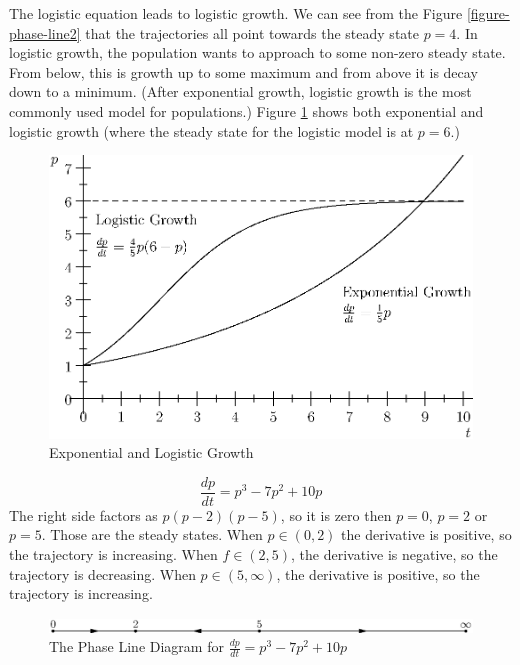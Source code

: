 \documentclass[fleqn]{report}
\begin{document}
The logistic equation leads to logistic growth. We can see
from the Figure \ref{figure-phase-line2} that the trajectories
all point towards the steady state $p=4$. In logistic growth,
the population wants to approach to some non-zero steady
state. From below, this is growth up to some maximum and from
above it is decay down to a minimum. (After exponential
growth, logistic growth is the most commonly used model for
populations.) Figure \ref{figure-exponential-growth}
shows both exponential and logistic growth (where the steady
state for the logistic model is at $p=6$.)

\begin{figure}[t]
\centering
\includegraphics[width=12cm]{figure44.eps}
\caption{Exponential and Logistic Growth}
\label{figure-exponential-growth}
\end{figure}

\begin{example}
\begin{equation*}
\frac{dp}{dt} = p^3 -7p^2 + 10p
\end{equation*}
The right side factors as $p(p-2)(p-5)$, so it is zero then
$p=0$, $p=2$ or $p=5$. Those are the
steady states. When $p \in (0,2)$ the derivative is positive,
so the trajectory is increasing. When $f \in (2,5)$, the
derivative is negative, so the trajectory is decreasing. When
$p \in (5,\infty)$, the derivative is positive, so the
trajectory is increasing. 
\end{example}

\begin{figure}[t]
\centering
\includegraphics[width=12cm]{figure42.eps}
\caption{The Phase Line Diagram for $\frac{dp}{dt} = p^3 -
7p^2 + 10p$}
\label{figure-phase-line3}
\end{figure}
\end{document}
